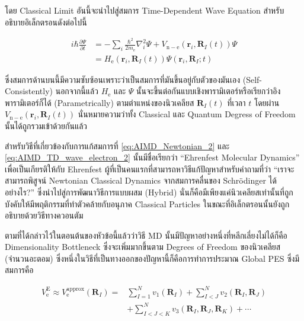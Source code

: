 โดย Classical Limit อันนี้จะนำไปสู่สมการ Time-Dependent Wave Equation สำหรับอธิบายอิเล็กตรอนดังต่อไปนี้

\begin{align}
  \label{eq:AIMD_TD_wave_electron_1}
  i \hbar \frac{\partial \Psi}{\partial t}
   & = -\sum_i \frac{\hbar^2}{2 m_{\mathrm{e}}} \nabla_i^2 \Psi
  + V_{\mathrm{n}-\mathrm{e}}\left(\mathbf{r}_i,\mathbf{R}_I(t)\right) \Psi \\
  \label{eq:AIMD_TD_wave_electron_2}
   & = H_{\mathrm{e}}\left(\mathbf{r}_i,\mathbf{R}_I(t)\right)
  \Psi\left(\mathbf{r}_i,\mathbf{R}_I ; t\right)
\end{align}

\noindent ซึ่งสมการด้านบนนี้มีความซับซ้อนเพราะว่าเป็นสมการที่มันขึ้นอยู่กับตัวของมันเอง (Self-Consistently) นอกจากนี้แล้ว
$H_{\mathrm{e}}$ และ $\Psi$ นั้นจะขึ้นต่อกันแบบเชิงพารามิเตอร์หรือเรียกว่าอิงพารามิเตอร์ก็ได้ (Parametrically) ตามตำแหน่งของนิวเคลียส
$\mathbf{R}_I(t)$ ที่เวลา $t$ โดยผ่าน $V_{\mathrm{n}-\mathrm{e}}\left(\mathbf{r}_i,\mathbf{R}_I(t)\right)$
นั่นหมายความว่าทั้ง Classical และ Quantum Degress of Freedom นั้นได้ถูกรวมเข้าด้วยกันแล้ว

สำหรับวิธีที่เกี่ยวข้องกับการแก้สมการที่ \eqref{eq:AIMD_Newtonian_2} และ \eqref{eq:AIMD_TD_wave_electron_2} นั้นมีชื่อเรียกว่า
\enquote{Ehrenfest Molecular Dynamics} เพื่อเป็นเกียรติให้กับ Ehrenfest ผู้ที่เป็นคนแรกที่สามารถหาวิธีแก้ปัญหาสำหรับคำถามที่ว่า
\enquote{เราจะสามารถพิสูจน์ Newtonian Classical Dynamics จากสมการคลื่นของ Schr\"{o}dinger ได้อย่างไร?}
ซึ่งนำไปสู่การพัฒนาวิธีการแบบผสม (Hybrid) นั่นก็คือมีเพียงแค่นิวเคลียสเท่านั้นที่ถูกบังคับให้มีพฤติกรรมที่ทำตัวคล้ายกับอนุภาค Classical
Particles ในขณะที่อิเล็กตรอนนั้นยังถูกอธิบายด้วยวิธีทางควอนตัม

ตามที่ได้กล่าวไว้ในตอนต้นของหัวข้อนี้แล้วว่าวิธี MD นั้นมีปัญหาอย่างหนึ่งที่หลีกเลี่ยงไม่ได้ก็คือ Dimensionality Bottleneck ซึ่งจะเพิ่มมากขึ้นตาม
Degrees of Freedom ของนิวเคลียส (จำนวนอะตอม) ซึ่งหนึ่งในวิธีที่เป็นทางออกของปัญหานี้ก็คือการทำการประมาณ Global PES ซึ่งมีสมการคือ

\begin{align}
  \label{eq:global_PES}
  V_{\mathrm{e}}^{\mathrm{E}} \approx V_{\mathrm{e}}^{\mathrm{approx}}\left(\mathbf{R}_I\right)
  = &
  \sum_{I=1}^N v_1\left(\mathbf{R}_I\right)+\sum_{I<J}^N v_2\left(\mathbf{R}_I, \mathbf{R}_J\right) \nonumber \\
    & +\sum_{I<J<K}^N v_3\left(\mathbf{R}_I, \mathbf{R}_J, \mathbf{R}_K\right) + \cdots
\end{align}

